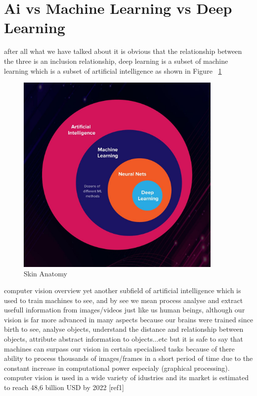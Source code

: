 \section{Ai vs Machine Learning vs Deep Learning}
    after all what we have talked about it is obvious that the relationship between the three is an inclusion relationship, deep learning is a subset of machine learning which is a subset of artificial intelligence as shown in Figure ~\ref{fig:versus} 

\begin{figure}[htbp]
\begin{center}
\includegraphics[width=10cm]{./chapter-02-general-ai-information/versus.jpg}
\end{center}
\caption{Skin Anatomy ~\cite{versus}}
\label{fig:versus}
\end{figure}



computer vision
    overview
        yet another subfield of artificial intelligence which is used to train machines to see, and by see we mean process analyse and extract usefull information from images/videos just like us human beings, although our vision is far more advanced in many aspects because our brains were trained since birth to see, analyse objects, understand the distance and relationship between objects, attribute abstract information to objects...etc but it is safe to say that machines can surpass our vision in certain specialised tasks because of there ability to process thousands of images/frames in a short period of time due to the constant increase in computational power especialy (graphical processing). computer vision is used in a wide variety of idustries and its market is estimated to reach 48,6 billion USD by 2022 [ref1]


